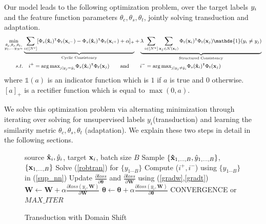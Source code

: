 Our model leads to the following optimization problem, over the target labels $y_i$ and the feature function parameters $\theta_c, \theta_s, \theta_t$, jointly solving transduction and adaptation. 
\begin{equation}
\small
\begin{aligned}
\min_{\substack{\theta_c,\theta_s,\theta_t, \\ y_1, \ldots y_{N^u}}} &\underbrace{\sum_{i \in [N^s]} [\Phi_s(\xsi)^\intercal \Phi_t(\mathbf{x}_{i^-}) -\Phi_s(\xsi)^\intercal \Phi_t(\mathbf{x}_{i^+}) + \alpha]_{+}}_{\text{Cyclic Consistency}}  +\underbrace{\lambda \sum_{i \in [N^u]} \sum_{\xuj \in \mathcal{N}(\xui)}  \Phi_t(\xui)^\intercal \Phi_t(\xuj) \mathds{1}(y_i \neq y_j)}_{\text{Structured Consistency}}\\
s.t. &\quad i^{+} = {\arg\max}_{j | y_j = \hat{y}_i} \Phi_s(\xsi)^\intercal \Phi_t(\xuj) \quad \quad \text{and} \quad \quad  i^{-} = {\arg\max}_{j | y_j \neq \hat{y}_i}  \Phi_s(\xsi)^\intercal \Phi_t(\xuj)
\end{aligned}
\label{loss}
\end{equation}
where $\mathds{1}(a)$ is an indicator function which is $1$ if $a$ is true and $0$ otherwise. $[a]_+$ is a rectifier function which is equal to $\max(0, a)$.

We solve this optimization problem via alternating minimization through iterating over solving for unsupervised labels $y_i$(transduction) and learning the similarity metric $\theta_c,\theta_s,\theta_t$ (adaptation). We explain these two steps in detail in the following sections.


\begin{figure}
    \begin{minipage}{0.5\textwidth}
    \vspace{-1cm}
\begin{algorithm}[H]
   \caption{Transduction with Domain Shift}
   \label{alg:example}
\begin{algorithmic}
    source $\mathbf{\hat{x}}_i,\hat{y}_i$, target $\mathbf{x}_i$, batch size $B$
   \REPEAT
   \STATE  Sample $\{\mathbf{\hat{x}}_{1,\ldots,B},\hat{y}_{1,\ldots,B} \}$, $\{\mathbf{x}_{1,\ldots,B}\}$
   \STATE Solve (\ref{robtran}) for $\{y_{1 \cdots B}\}$
   \STATE Compute ($i^+, i^-$) using $\{y_{1 \cdots B}\}$ in (\ref{sup_nn})
   \STATE Update $\frac{\partial loss}{\partial \mathbf{\theta}}$ and  $\frac{\partial loss}{\partial \mathbf{W}} $ using (\ref{gradw},\ref{gradt})
   \ENDIF
   \ENDFOR
   \STATE $\mathbf{W} \leftarrow \mathbf{W} + \alpha \frac{\partial loss (y_i, \mathbf{W})}{\partial \mathbf{W}}$ 
   \STATE $\mathbf{\theta} \leftarrow \mathbf{\theta} + \alpha \frac{\partial loss (y_i, \mathbf{W})}{\partial \mathbf{\theta}}$
   \UNTIL CONVERGENCE or $MAX\_ITER$
\end{algorithmic}
\end{algorithm}
\vspace{-1cm}
  \end{minipage}
  \end{figure}





